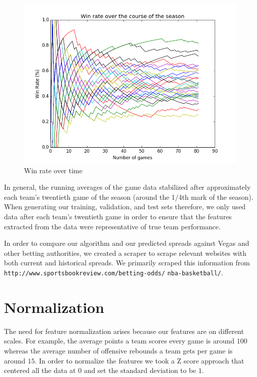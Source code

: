 \documentclass{article}
\begin{document}
\begin{figure}[width=\linewidth]
\centering
  \includegraphics[width=1\linewidth]{code/figures/win_rate.png}
\caption{Win rate over time}
\end{figure}

In general, the running averages of the game data stabilized after approximately each team's twentieth game of the season (around the 1/4th mark of the season). When generating our training, validation, and test sets therefore, we only used data after each team's twentieth game in order to ensure that the features extracted from the data were representative of true team performance.

In order to compare our algorithm and our predicted spreads against Vegas and other betting authorities, we created a scraper to scrape relevant websites with both current and historical spreads. We primarily scraped this information from \texttt{http://www.sportsbookreview.com/betting-odds/} \texttt{nba-basketball/}.

\section{Normalization}
The need for feature normalization arises because our features are on different scales. For example, the average points a team scores every game is around $100$ whereas the average number of offensive rebounds a team gets per game is around $15$. In order to normalize the features we took a Z score approach that centered all the data at $0$ and set the standard deviation to be $1$.
\end{document}
